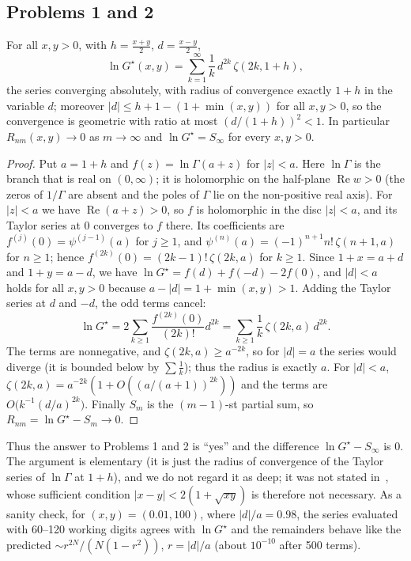 \subsection{Problems 1 and 2}
\begin{proposition}\label{prop:gurland}
For all $x,y>0$, with $h=\frac{x+y}2$, $d=\frac{x-y}2$,
\[
\ln G^\star(x,y)=\sum_{k=1}^\infty\frac1k\,d^{2k}\,\zeta(2k,1+h),
\]
the series converging absolutely, with radius of convergence exactly $1+h$ in the variable $d$; moreover $|d|\le h+1-(1+\min(x,y))$ for all $x,y>0$, so the convergence is geometric with ratio at most $(d/(1+h))^2<1$. In particular $R_{nm}(x,y)\to0$ as $m\to\infty$ and $\ln G^\star=S_\infty$ for every $x,y>0$.
\end{proposition}
\begin{proof}
Put $a=1+h$ and $f(z)=\ln\Gamma(a+z)$ for $|z|<a$. Here $\ln\Gamma$ is the branch that is real on $(0,\infty)$; it is holomorphic on the half-plane $\operatorname{Re}w>0$ (the zeros of $1/\Gamma$ are absent and the poles of $\Gamma$ lie on the non-positive real axis). For $|z|<a$ we have $\operatorname{Re}(a+z)>0$, so $f$ is holomorphic in the disc $|z|<a$, and its Taylor series at $0$ converges to $f$ there. Its coefficients are $f^{(j)}(0)=\psi^{(j-1)}(a)$ for $j\ge1$, and $\psi^{(n)}(a)=(-1)^{n+1}n!\,\zeta(n+1,a)$ for $n\ge1$; hence $f^{(2k)}(0)=(2k-1)!\,\zeta(2k,a)$ for $k\ge1$. Since $1+x=a+d$ and $1+y=a-d$, we have $\ln G^\star=f(d)+f(-d)-2f(0)$, and $|d|<a$ holds for all $x,y>0$ because $a-|d|=1+\min(x,y)>1$. Adding the Taylor series at $d$ and $-d$, the odd terms cancel:
\[
\ln G^\star=2\sum_{k\ge1}\frac{f^{(2k)}(0)}{(2k)!}d^{2k}=\sum_{k\ge1}\frac1k\,\zeta(2k,a)\,d^{2k}.
\]
The terms are nonnegative, and $\zeta(2k,a)\ge a^{-2k}$, so for $|d|=a$ the series would diverge (it is bounded below by $\sum\frac1k$); thus the radius is exactly $a$. For $|d|<a$, $\zeta(2k,a)=a^{-2k}(1+O((a/(a+1))^{2k}))$ and the terms are $O\big(k^{-1}(d/a)^{2k}\big)$. Finally $S_m$ is the $(m-1)$-st partial sum, so $R_{nm}=\ln G^\star-S_m\to0$.
\end{proof}

Thus the answer to Problems 1 and 2 is ``yes'' and the difference $\ln G^\star-S_\infty$ is $0$. The argument is elementary (it is just the radius of convergence of the Taylor series of $\ln\Gamma$ at $1+h$), and we do not regard it as deep; it was not stated in~\cite{Wis}, whose sufficient condition $|x-y|<2(1+\sqrt{xy})$ is therefore not necessary. As a sanity check, for $(x,y)=(0.01,100)$, where $|d|/a=0.98$, the series evaluated with 60--120 working digits agrees with $\ln G^\star$ and the remainders behave like the predicted $\sim r^{2N}/(N(1-r^2))$, $r=|d|/a$ (about $10^{-10}$ after 500 terms).

